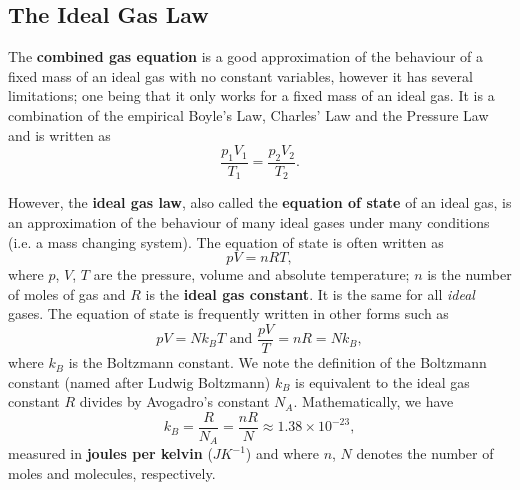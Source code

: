 \subsection{The Ideal Gas Law}
The \textbf{combined gas equation} is a good approximation of the behaviour of a fixed mass of an ideal gas with no constant variables, however it has several limitations; one being that it only works for a fixed mass of an ideal gas. It is a combination of the empirical Boyle's Law, Charles' Law and the Pressure Law and is written as
\begin{equation}
    \frac{p_1 V_1}{T_1} = \frac{p_2 V_2}{T_2}.
\end{equation}

However, the \textbf{ideal gas law}, also called the \textbf{equation of state} of an ideal gas, is an approximation of the behaviour of many ideal gases under many conditions (i.e. a mass changing system). The equation of state is often written as 
\begin{equation}
    pV = nRT,
\end{equation}
where $p$, $V$, $T$ are the pressure, volume and absolute temperature; $n$ is the number of moles of gas and $R$ is the \textbf{ideal gas constant}. It is the same for all \textit{ideal} gases. The equation of state is frequently written in other forms such as
\begin{equation}
    pV = N k_B T \text{ and } \frac{pV}{T} = nR = N k_B,
\end{equation}
where $k_B$ is the Boltzmann constant. We note the definition of the Boltzmann constant (named after Ludwig Boltzmann) $k_B$ is equivalent to the ideal gas constant $R$ divides by Avogadro's constant $N_A$. Mathematically, we have
\begin{equation}
    \label{eq:boltzmann-constant}
    k_B = \frac{R}{N_A} = \frac{nR}{N} \approx 1.38 \times 10^{-23},
\end{equation}
measured in \textbf{joules per kelvin} ($JK^{-1}$) and where $n$, $N$ denotes the number of moles and molecules, respectively. \\

